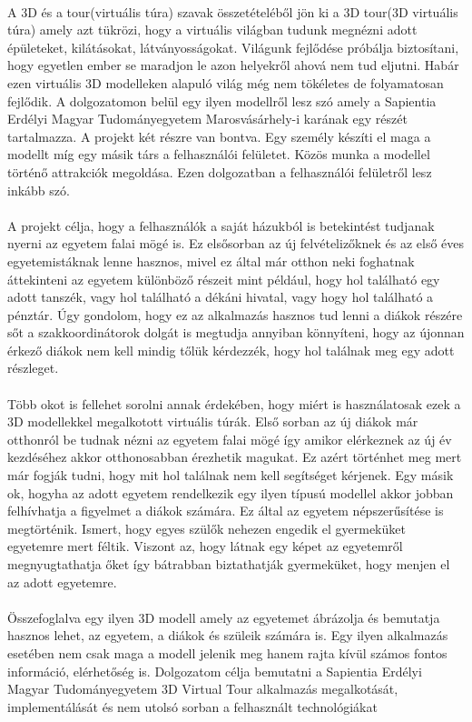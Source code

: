 \paragraph{}
A 3D és a tour(virtuális túra) szavak összetételéből jön ki a 3D tour(3D virtuális túra) amely azt tükrözi, hogy a virtuális világban tudunk megnézni adott épületeket, kilátásokat, látványosságokat. Világunk fejlődése próbálja biztosítani, hogy egyetlen ember se maradjon le azon helyekről ahová nem tud eljutni. Habár ezen virtuális 3D modelleken alapuló világ még nem tökéletes de folyamatosan fejlődik. A dolgozatomon belül egy ilyen modellről lesz szó amely a Sapientia Erdélyi Magyar Tudományegyetem Marosvásárhely-i karának egy részét tartalmazza. A projekt két részre van bontva. Egy személy készíti el maga a modellt míg egy másik társ a felhasználói felületet. Közös munka a modellel történő attrakciók megoldása. Ezen dolgozatban a felhasználói felületről lesz inkább szó. 
\paragraph{}
A projekt célja, hogy a felhasználók a saját házukból is betekintést tudjanak nyerni az egyetem falai mögé is. Ez elsősorban az új felvételizőknek és az első éves egyetemistáknak lenne hasznos, mivel ez által már otthon neki foghatnak áttekinteni az egyetem különböző részeit mint például, hogy hol található egy adott tanszék, vagy hol található a dékáni hivatal, vagy hogy hol található a pénztár. Úgy gondolom, hogy ez az alkalmazás hasznos tud lenni a diákok részére sőt a szakkoordinátorok dolgát is megtudja annyiban könnyíteni, hogy az újonnan érkező diákok nem kell mindig tőlük kérdezzék, hogy hol találnak meg egy adott részleget.
\paragraph{}
Több okot is fellehet sorolni annak érdekében, hogy miért is használatosak ezek a 3D modellekkel megalkotott virtuális túrák. Első sorban az új diákok már otthonról be tudnak nézni az egyetem falai mögé így amikor elérkeznek az új év kezdéséhez akkor otthonosabban érezhetik magukat. Ez azért történhet meg mert már fogják tudni, hogy mit hol találnak nem kell segítséget kérjenek. Egy másik ok, hogyha az adott egyetem rendelkezik egy ilyen típusú modellel akkor jobban felhívhatja a figyelmet a diákok számára. Ez által az egyetem népszerűsítése is megtörténik. Ismert, hogy egyes szülők nehezen engedik el gyermeküket egyetemre mert féltik. Viszont az, hogy látnak egy  képet az egyetemről megnyugtathatja őket így bátrabban biztathatják gyermeküket, hogy menjen el az adott egyetemre. 
\paragraph{}
Összefoglalva egy ilyen 3D modell amely az egyetemet ábrázolja és bemutatja hasznos lehet, az egyetem, a diákok és szüleik számára is. Egy ilyen alkalmazás esetében nem csak maga a modell jelenik meg hanem rajta kívül számos fontos információ, elérhetőség is. Dolgozatom célja bemutatni a Sapientia Erdélyi Magyar Tudományegyetem 3D Virtual Tour alkalmazás megalkotását, implementálását és nem utolsó sorban a felhasznált technológiákat

